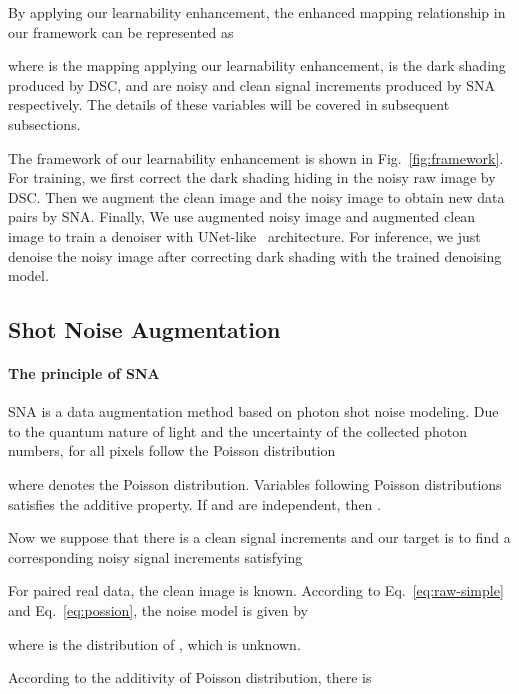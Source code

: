 \documentclass[sigconf,screen,nonacm]{acmart}
\begin{document}
By applying our learnability enhancement, the enhanced mapping relationship in our framework can be represented as

where  is the mapping applying our learnability enhancement,  is the dark shading produced by DSC,  and  are noisy and clean signal increments produced by SNA respectively. The details of these variables will be covered in subsequent subsections.

The framework of our learnability enhancement is shown in Fig.~\ref{fig:framework}. For training, we first correct the dark shading hiding in the noisy raw image by DSC. Then we augment the clean image and the noisy image to obtain new data pairs by SNA. Finally, We use augmented noisy image and augmented clean image to train a denoiser with UNet-like~\cite{Unet} architecture. For inference, we just denoise the noisy image after correcting dark shading with the trained denoising model.









 \subsection{Shot Noise Augmentation}
  \label{SNA}
    \paragraph{\textbf{The principle of SNA}}
    SNA is a data augmentation method based on photon shot noise modeling.
    Due to the quantum nature of light and the uncertainty of the collected photon numbers,  for all pixels follow the Poisson distribution
    
    where  denotes the Poisson distribution.
    Variables following Poisson distributions satisfies the additive property. If  and  are independent, then .


    Now we suppose that there is a clean signal increments  and our target is to find a corresponding noisy signal increments  satisfying
    

    For paired real data, the clean image  is known.
    According to Eq.~\eqref{eq:raw-simple} and Eq.~\eqref{eq:possion}, the noise model  is given by
    
    where  is the distribution of , which is unknown.

    According to the additivity of Poisson distribution, there is
    
\end{document}
